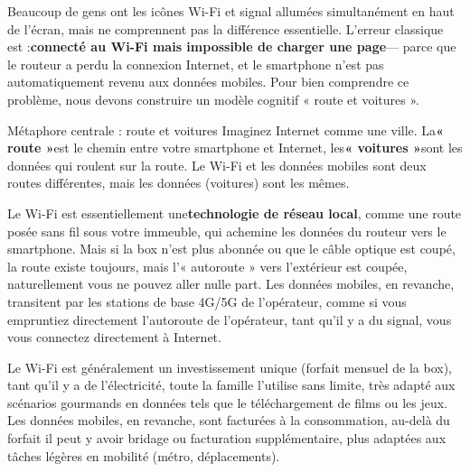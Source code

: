 


Beaucoup de gens ont les icônes Wi-Fi et signal allumées simultanément en haut de l'écran, mais ne comprennent pas la différence essentielle. L'erreur classique est :\textbf{connecté au Wi-Fi mais impossible de charger une page}— parce que le routeur a perdu la connexion Internet, et le smartphone n'est pas automatiquement revenu aux données mobiles. Pour bien comprendre ce problème, nous devons construire un modèle cognitif « route et voitures ».

\begin{tcbinfo}{Métaphore centrale : route et voitures}
Imaginez Internet comme une ville. La\textbf{« route »}est le chemin entre votre smartphone et Internet, les\textbf{« voitures »}sont les données qui roulent sur la route. Le Wi-Fi et les données mobiles sont deux routes différentes, mais les données (voitures) sont les mêmes.

\end{tcbinfo}


Le Wi-Fi est essentiellement une\textbf{technologie de réseau local}, comme une route posée sans fil sous votre immeuble, qui achemine les données du routeur vers le smartphone. Mais si la box n'est plus abonnée ou que le câble optique est coupé, la route existe toujours, mais l'« autoroute » vers l'extérieur est coupée, naturellement vous ne pouvez aller nulle part. Les données mobiles, en revanche, transitent par les stations de base 4G/5G de l'opérateur, comme si vous empruntiez directement l'autoroute de l'opérateur, tant qu'il y a du signal, vous vous connectez directement à Internet.


Le Wi-Fi est généralement un investissement unique (forfait mensuel de la box), tant qu'il y a de l'électricité, toute la famille l'utilise sans limite, très adapté aux scénarios gourmands en données tels que le téléchargement de films ou les jeux. Les données mobiles, en revanche, sont facturées à la consommation, au-delà du forfait il peut y avoir bridage ou facturation supplémentaire, plus adaptées aux tâches légères en mobilité (métro, déplacements).

